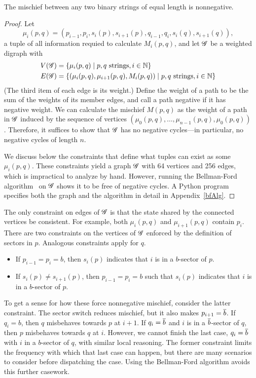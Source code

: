 \begin{thm}\label{morale}
The mischief between any two binary strings of equal length is nonnegative.
\end{thm}

\begin{proof}
Let
\[
  \mu_i(p,q) = (p_{i-1},p_i,s_i(p),s_{i+1}(p),q_{i-1},q_i,s_i(q),s_{i+1}(q)),
\]
a tuple of all information requied to calculate $M_i(p,q)$, and let $\mathscr{G}$ be a
weighted digraph with
\begin{align*}
  \V[\G] &= \set{\mu_i(p,q)}{p,q \text{ strings}, i \in \nats} \\
  \E[\G] &= \set{(\mu_i(p,q),\mu_{i+1}(p,q),M_i(p,q))}{p,q \text{ strings}, i
    \in \nats}
\end{align*}
(The third item of each edge is its weight.) Define the weight of a path to be
the sum of the weights of its member edges, and call a path negative if it has
negative weight. We can calculate the mischief $M(p,q)$ as the weight of a path
in $\mathscr{G}$ induced by the sequence of vertices $(\mu_0(p,q), \dots,
\mu_{n-1}(p,q), \mu_0(p,q))$. Therefore, it suffices to show that $\mathscr{G}$ has no
negative cycles---in particular, no negative cycles of length $n$.

We discuss below the constraints that define what tuples can exist as some
$\mu_i(p,q)$. These constraints yield a graph $\mathscr{G}$ with 64 vertices and 256
edges, which is impractical to analyze by hand. However, running the
Bellman-Ford algorithm~\cite{bellmanford} on $\mathscr{G}$ shows it to be free of
negative cycles. A Python program specifies both the graph and the algorithm in
detail in Appendix~\ref{bfAlg}.
\end{proof}

The only constraint on edges of $\mathscr{G}$ is that the state shared by the connected
vertices be consistent. For example, both $\mu_i(p,q)$ and $\mu_{i+1}(p,q)$
contain $p_i$. There are two constraints on the vertices of $\mathscr{G}$ enforced by
the definition of sectors in $p$. Analogous constraints apply for $q$.
\begin{itemize}
\item If $p_{i-1} = p_i = b$, then $s_i(p)$ indicates that $i$ is in a
  $b$-sector of $p$.
\item If $s_i(p) \neq s_{i+1}(p)$, then $p_{i-1} = p_i = b$ such that $s_i(p)$
  indicates that $i$ is in a $b$-sector of $p$.
\end{itemize}
To get a sense for how these force nonnegative mischief, consider the latter
constraint. The sector switch reduces mischief, but it also makes $p_{i+1} =
\overline{b}$. If $q_i = b$, then $q$ misbehaves towards $p$ at $i+1$. If $q_i =
\overline{b}$ and $i$ is in a $\overline{b}$-sector of $q$, then $p$ misbehaves towards $q$
at $i$. However, we cannot finish the last case, $q_i = \overline{b}$ with $i$ in a
$b$-sector of $q$, with similar local reasoning. The former constraint limits
the frequency with which that last case can happen, but there are many
scenarios to consider before dispatching the case. Using the Bellman-Ford
algorithm avoids this further casework.

